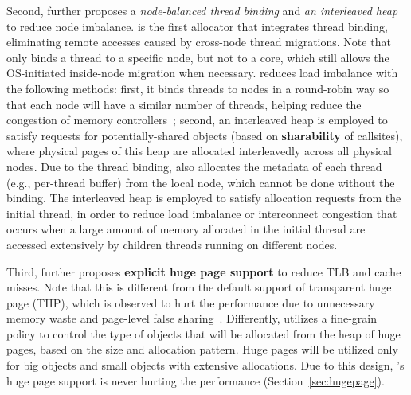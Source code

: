 Second, \NM{} further proposes a \textit{node-balanced thread binding} and \textit{an interleaved heap} to reduce node imbalance. \NM{} is the first allocator that integrates thread binding, eliminating remote accesses caused by cross-node thread migrations. Note that \NM{} only binds a thread to a specific node, but not to a core, which still allows the OS-initiated inside-node migration when necessary. \NM{} reduces load imbalance with the following methods: first, it binds threads to nodes in a round-robin way so that each node will have a similar number of threads, helping reduce the congestion of memory controllers~\cite{Blagodurov:2011:CNC:2002181.2002182}; second, an interleaved heap is employed to satisfy requests for potentially-shared objects (based on \textbf{sharability} of callsites), where physical pages of this heap are allocated interleavedly across all physical nodes. Due to the thread binding, \NM{} also allocates the metadata of each thread (e.g., per-thread buffer) from the local node, which cannot be done without the binding. The interleaved heap is employed to satisfy allocation requests from the initial thread, in order to reduce load imbalance or interconnect congestion that occurs when a large amount of memory allocated in the initial thread are accessed extensively by children threads running on different nodes. 
 
Third, \NM{} further proposes \textbf{explicit huge page support} to reduce TLB and cache misses. Note that this is different from the default support of transparent huge page (THP), which is observed to hurt the performance due to unnecessary memory waste and page-level false sharing~\cite{Gaud:2014:LPM:2643634.2643659, DBLP:conf/asplos/PanwarBG19, DBLP:conf/asplos/MaasAIJMR20}. Differently, \NM{} utilizes a fine-grain policy to control the type of objects that will be allocated from the heap of huge pages, based on the size and allocation pattern. Huge pages will be utilized only for big objects and small objects with extensive allocations. Due to this design, \NM{}'s huge page support is never hurting the performance (Section~\ref{sec:hugepage}). 
 
